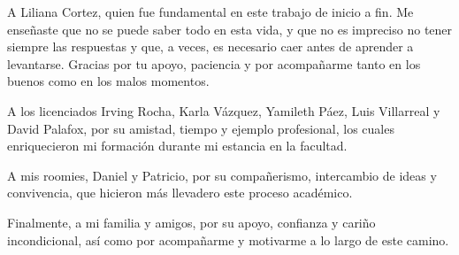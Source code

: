 \documentclass[12pt]{article}
\begin{document}
A Liliana Cortez, quien fue fundamental en este trabajo de inicio a fin. Me enseñaste que no se puede saber todo en esta vida, y que no es impreciso  no tener siempre las respuestas y que, a veces, es necesario caer antes de aprender a levantarse. Gracias por tu apoyo, paciencia y por acompañarme tanto en los buenos como en los malos momentos.

A los licenciados Irving Rocha, Karla Vázquez, Yamileth Páez, Luis Villarreal y David Palafox, por su amistad, tiempo y ejemplo profesional, los cuales enriquecieron mi formación durante mi estancia en la facultad.

A mis roomies, Daniel y Patricio, por su compañerismo, intercambio de ideas y convivencia, que hicieron más llevadero este proceso académico.

Finalmente, a mi familia y amigos, por su apoyo, confianza y cariño incondicional, así como por acompañarme y motivarme a lo largo de este camino.
\end{document}
